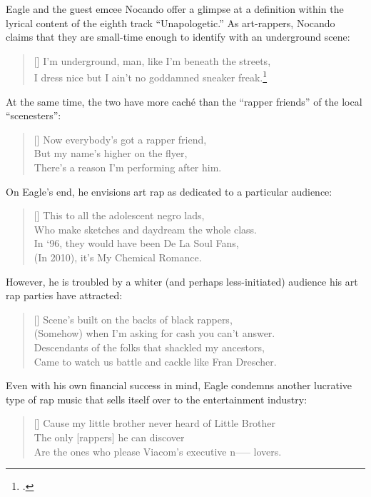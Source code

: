 Eagle and the guest emcee Nocando offer a glimpse at a definition within the lyrical content of
the eighth track ``Unapologetic.'' As art-rappers, Nocando claims that they are small-time enough
to identify with an underground scene:
\settowidth{\versewidth}{I dress nice but I ain't no goddamned sneaker freak.}
    \begin{verse}[\versewidth]
        \small I'm underground, man, like I'm beneath the streets, \\ 
        \small I dress nice but I ain't no goddamned sneaker freak.\footnote{
            \cite{openmikeeagle2010}.}
    \end{verse}
At the same time, the two have more caché than the ``rapper friends''  of the local  
``scenesters'':
\settowidth{\versewidth}{There's a reason I'm performing after him.}
    \begin{verse}[\versewidth]
        \small Now everybody's got a rapper friend, \\ 
        \small But my name's higher on the flyer,\\
        \small There's a reason I'm performing after him.
    \end{verse}
On Eagle's end, he envisions art rap as dedicated to a particular audience:
\settowidth{\versewidth}{Who make sketches and daydream the whole class.}
    \begin{verse}[\versewidth]
        \small This to all the adolescent negro lads, \\
        \small Who make sketches and daydream the whole class. \\
        \small In `96, they would have been De La Soul Fans, \\
        \small (In 2010), it's My Chemical Romance.
    \end{verse}
However, he is troubled by a whiter (and perhaps less-initiated) audience his art rap 
parties have attracted:
\settowidth{\versewidth}{Came to watch us battle and cackle like Fran Drescher.}
    \begin{verse}[\versewidth]
        \small Scene's built on the backs of black rappers, \\
        \small (Somehow) when I'm asking for cash you can't answer. \\ 
        \small Descendants of the folks that shackled my ancestors, \\ 
        \small Came to watch us battle and cackle like Fran Drescher.
    \end{verse}
Even with his own financial success in mind, Eagle condemns another lucrative type of rap music
that sells itself over to the entertainment industry:
\settowidth{\versewidth}{Cause my little brother never heard of Little Brother \textellipsis}
    \begin{verse}[\versewidth]
        \small Cause my little brother never heard of Little Brother \textellipsis \\ 
        \small The only [rappers] he can discover \\
        \small Are the ones who please Viacom's executive n----- lovers.
    \end{verse}

